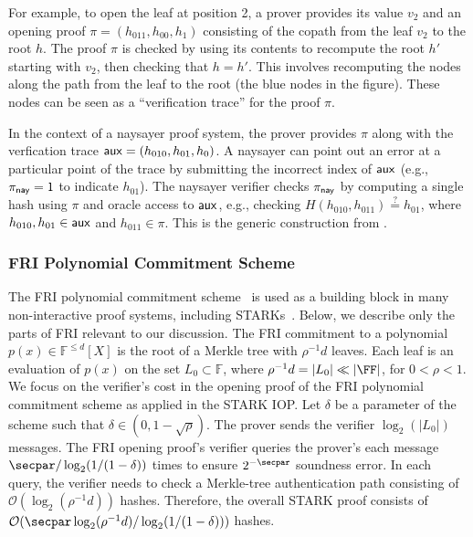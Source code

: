 For example, to open the leaf at position 2, a prover provides its value $v_2$ and an opening proof $\pi = (h_{011}, h_{00}, h_{1})$ consisting of the copath from the leaf $v_2$ to the root $h$. The proof $\pi$ is checked by using its contents to recompute the root $h'$ starting with $v_2$, then checking that $h = h'$. This involves recomputing the nodes along the path from the leaf to the root (the blue nodes in the figure). These nodes can be seen as a ``verification trace'' for the proof $\pi$.
    
In the context of a naysayer proof system, the prover provides $\pi$ along with the verfication trace $\mathsf{aux} = (h_{010}, h_{01}, h_{0})$. A naysayer can point out an error at a particular point of the trace by submitting the incorrect index of $\mathsf{aux}$ (e.g., $\pi_{\mathsf{nay}} = 1$ to indicate $h_{01}$). The naysayer verifier checks $\pi_{\mathsf{nay}}$ by computing a single hash using $\pi$ and oracle access to $\mathsf{aux}$, e.g., checking $H(h_{010}, h_{011}) \stackrel{?}{=} h_{01}$, where $h_{010}, h_{01} \in \mathsf{aux}$ and $h_{011} \in \pi$. This is the generic construction from .

\subsubsection{FRI Polynomial Commitment Scheme}\label{sec:fri_naysayer}


The FRI polynomial commitment scheme~\cite{EPRINT:BBHR18} is used as a building block in many non-interactive proof systems, including STARKs~\cite{STOC:BCGT13}.
Below, we describe only the parts of FRI relevant to our discussion. The FRI commitment to a polynomial $p(x)\in\mathbb{F}^{\leq d}[X]$ is the root of a Merkle tree with $\rho^{-1}d$ leaves. 
Each leaf is an evaluation of $p(x)$ on the set $L_0\subset\mathbb{F}$, where $\rho^{-1}d=\vert L_0\vert\ll\vert\FF\vert$, for $0<\rho<1$. We focus on the verifier's cost in the opening proof of the FRI polynomial commitment scheme as applied in the STARK IOP. Let $\delta$ be a parameter of the scheme such that $\delta\in(0,1-\sqrt{\rho})$. The prover sends the verifier $\log_2(\vert L_0\vert)$ messages. The FRI opening proof's verifier queries the prover's each message $\secpar/\log_2(1/(1-\delta))$ times to ensure $2^{-\secpar}$ soundness error. In each query, the verifier needs to check a Merkle-tree authentication path consisting of $\mathcal{O}(\log_2(\rho^{-1}d))$ hashes. Therefore, the overall STARK proof consists of $\mathcal{O}(\secpar\log_2(\rho^{-1}d)/\log_2(1/(1-\delta)))$ hashes. 

